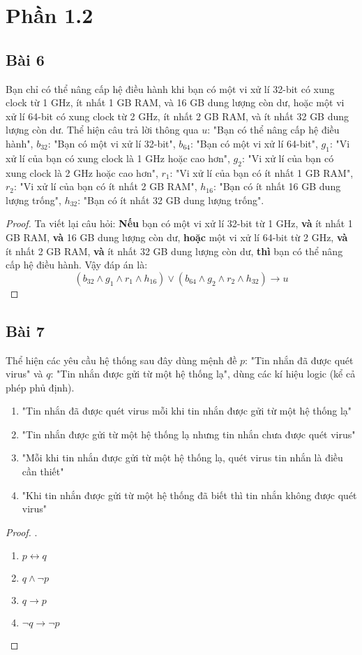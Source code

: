 \section*{Phần 1.2}
\subsection*{Bài 6}
Bạn chỉ có thể nâng cấp hệ điều hành khi bạn có một vi xử lí 32-bit có xung clock từ 1 GHz, ít nhất 1 GB RAM, và 16 GB dung lượng còn dư, hoặc một vi xử lí 64-bit có xung clock từ 2 GHz, ít nhất 2 GB RAM, và ít nhất 32 GB dung lượng còn dư. Thể hiện câu trả lời thông qua $u$: "Bạn có thể nâng cấp hệ điều hành", $b_{32}$: "Bạn có một vi xử lí 32-bit", $b_{64}$: "Bạn có một vi xử lí 64-bit", $g_1$: "Vi xử lí của bạn có xung clock là 1 GHz hoặc cao hơn", $g_2$: "Vi xử lí của bạn có xung clock là 2 GHz hoặc cao hơn", $r_1$: "Vi xử lí của bạn có ít nhất 1 GB RAM",  $r_2$: "Vi xử lí của bạn có ít nhất 2 GB RAM", $h_{16}$: "Bạn có ít nhất 16 GB dung lượng trống", $h_{32}$: "Bạn có ít nhất 32 GB dung lượng trống".
\begin{proof}
    Ta viết lại câu hỏi: \textbf{Nếu} bạn có một vi xử lí 32-bit từ 1 GHz, \textbf{và} ít nhất 1 GB RAM, \textbf{và} 16 GB dung lượng còn dư, \textbf{hoặc} một vi xử lí 64-bit từ 2 GHz, \textbf{và} ít nhất 2 GB RAM, \textbf{và} ít nhất 32 GB dung lượng còn dư, \textbf{thì} bạn có thể nâng cấp hệ điều hành. Vậy đáp án là: $$(b_{32}\land g_1\land r_1\land h_{16})\lor(b_64\land g_2\land r_2\land h_{32})\rightarrow u$$
\end{proof}
\subsection*{Bài 7}
Thể hiện các yêu cầu hệ thống sau đây dùng mệnh đề $p$: "Tin nhắn đã được quét virus" và $q$: "Tin nhắn được gửi từ một hệ thống lạ", dùng các kí hiệu logic (kể cả phép phủ định).
\begin{enumerate}[label=\alph*)]
    \item "Tin nhắn đã được quét virus mỗi khi tin nhắn được gửi từ một hệ thống lạ"
    \item "Tin nhắn được gửi từ một hệ thống lạ nhưng tin nhắn chưa được quét virus"
    \item "Mỗi khi tin nhắn được gửi từ một hệ thống lạ, quét virus tin nhắn là điều cần thiết"
    \item "Khi tin nhắn được gửi từ một hệ thống đã biết thì tin nhắn không được quét virus"
\end{enumerate}
\begin{proof}.
    \begin{multicols}{4}
        \begin{enumerate}[label=\alph*)]
            \item $p\leftrightarrow q$
            \item $q\land\neg p$
            \item $q\rightarrow p$
            \item $\neg q\rightarrow\neg p$
        \end{enumerate}
    \end{multicols}
\end{proof}
